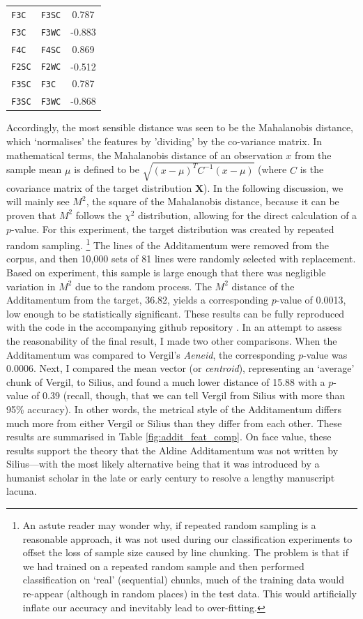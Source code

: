 \documentclass[11pt,a4paper]{scrartcl} %
\begin{document}
{\begin{table}
{\begin{tabular}{ | l | l | c |}
\texttt{F3C} & \texttt{F3SC} & 0.787 \\
\texttt{F3C} & \texttt{F3WC} & -0.883 \\
\texttt{F4C} & \texttt{F4SC} & 0.869 \\
\texttt{F2SC} & \texttt{F2WC} & -0.512 \\
\texttt{F3SC} & \texttt{F3C} & 0.787 \\
\texttt{F3SC} & \texttt{F3WC} & -0.868 \\
\hline
\end{tabular}}
\end{table}
Accordingly, the most sensible distance was seen to be the Mahalanobis distance, which `normalises' the features by 'dividing' by the co-variance matrix. In mathematical terms, the Mahalanobis distance of an observation $x$ from the sample mean $\mu$ is defined to be $\sqrt{(x-\mu)^{T}C^{-1}(x-\mu)}$ (where $C$ is the covariance matrix of the target distribution $\textbf{X}$). In the following discussion, we will mainly see $M^{2}$, the square of the Mahalanobis distance, because it can be proven that $M^{2}$ follows the $\chi^{2}$ distribution, allowing for the direct calculation of a $p$-value. For this experiment, the target distribution was created by repeated random sampling.%
\footnote{An astute reader may wonder why, if repeated random sampling is a reasonable approach, it was not used during our classification experiments to offset the loss of sample size caused by line chunking. The problem is that if we had trained on a repeated random sample and then performed classification on `real' (sequential) chunks, much of the training data would re-appear (although in random places) in the test data. This would artificially inflate our accuracy and inevitably lead to over-fitting.}
The lines of the Additamentum were removed from the corpus, and then 10,000 sets of 81 lines were randomly selected with replacement. Based on experiment, this sample is large enough that there was negligible variation in $M^{2}$ due to the random process. The $M^{2}$ distance of the Additamentum from the target, 36.82, yields a corresponding $p$-value of 0.0013, low enough to be statistically significant. These results can be fully reproduced with the code in the accompanying github repository \cite{nagy_hexml_2019}. In an attempt to assess the reasonability of the final result, I made two other comparisons. When the Additamentum was compared to Vergil's \textit{Aeneid}, the corresponding $p$-value was 0.0006. Next, I compared the mean vector (or \textit{centroid}), representing an `average' chunk of Vergil, to Silius, and found a much lower distance of 15.88 with a $p$-value of 0.39 (recall, though, that we can tell Vergil from Silius with more than 95\% accuracy). In other words, the metrical style of the Additamentum differs much more from either Vergil or Silius than they differ from each other. These results are summarised in Table \ref{fig:addit_feat_comp}. On face value, these results support the theory that the Aldine Additamentum was not written by Silius---with the most likely alternative being that it was introduced by a humanist scholar in the late  or early  century to resolve a lengthy manuscript lacuna. 

}
\end{document}
